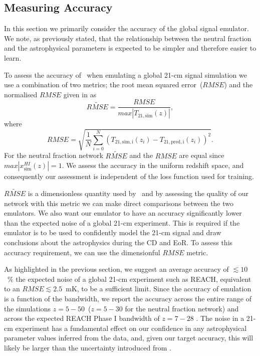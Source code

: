 \subsection{Measuring Accuracy}
\label{accuracy}
In this section we primarily consider the accuracy of the global signal emulator. We note, as previously stated, that the relationship between the neutral fraction and the astrophysical parameters is expected to be simpler and therefore easier to learn.

To assess the accuracy of \name~when emulating a global 21-cm signal simulation we use a combination of two metrics; the root mean squared error~($RMSE$) and the normalised $RMSE$ given in \cite{Cohen2020} as
\begin{equation}
    \widetilde{RMSE} = \frac{RMSE}{max|T_\mathrm{21, sim}(z)|},
    \label{eq:gemloss}
\end{equation}
where
\begin{equation}
    RMSE = \sqrt{\frac{1}{N} \sum_{i=0}^N(T_\mathrm{21, sim, i}(z_i) - T_\mathrm{21, pred,i}(z_i))^2}.
\end{equation}
For the neutral fraction network $\widetilde{RMSE}$ and the ${RMSE}$ are equal since $max|x^{HI}_\mathrm{sim}(z)| = 1$. We assess the accuracy in the uniform redshift space, and consequently our assessment is independent of the loss function used for training.

$\widetilde{RMSE}$ is a dimensionless quantity used by \cmGEM~and by assessing the quality of our network with this metric we can make direct comparisons between the two emulators. We also want our emulator to have an accuracy significantly lower than the expected noise of a global 21-cm experiment. This is required if the emulator is to be used to confidently model the 21-cm signal and draw conclusions about the astrophysics during the CD and EoR. To assess this accuracy requirement, we can use the dimensionful $RMSE$ metric. 

As highlighted in the previous section, we suggest an average accuracy of $\lesssim 10$~\% the expected noise of a global 21-cm experiment such as REACH, equivalent to an $RMSE\lesssim 2.5$~mK, to be a sufficient limit. Since the accuracy of emulation is a function of the bandwidth, we report the accuracy across the entire range of the simulations $z = 5-50$~($z=5-30$ for the neutral fraction network) and across the expected REACH Phase I bandwidth of $z = 7 - 28$ \cite{de_lera_acedo_reach_2022}. %
The noise in a 21-cm experiment has a fundamental effect on our confidence in any astrophysical parameter values inferred from the data, and, given our target accuracy, this will likely be larger than the uncertainty introduced from \name.

